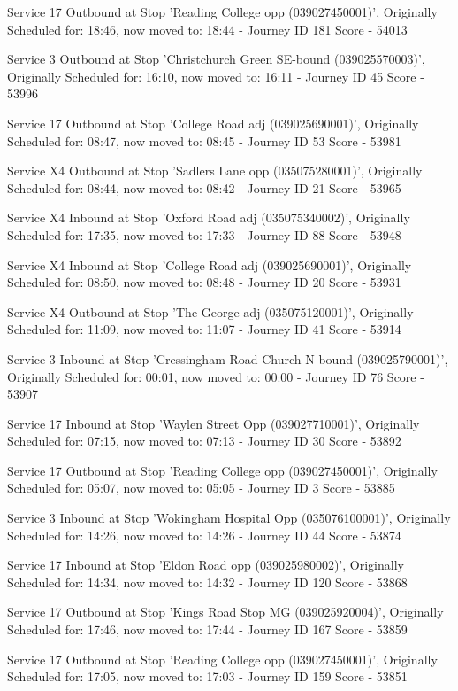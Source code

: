 \documentclass{article}
\begin{document}
Service 17 Outbound at Stop 'Reading College opp (039027450001)', Originally Scheduled for: 18:46, now moved to: 18:44 - Journey ID 181      Score - 54013

Service 3 Outbound at Stop 'Christchurch Green SE-bound (039025570003)', Originally Scheduled for: 16:10, now moved to: 16:11 - Journey ID 45      Score - 53996

Service 17 Outbound at Stop 'College Road adj (039025690001)', Originally Scheduled for: 08:47, now moved to: 08:45 - Journey ID 53      Score - 53981

Service X4 Outbound at Stop 'Sadlers Lane opp (035075280001)', Originally Scheduled for: 08:44, now moved to: 08:42 - Journey ID 21      Score - 53965

Service X4 Inbound at Stop 'Oxford Road adj (035075340002)', Originally Scheduled for: 17:35, now moved to: 17:33 - Journey ID 88      Score - 53948

Service X4 Inbound at Stop 'College Road adj (039025690001)', Originally Scheduled for: 08:50, now moved to: 08:48 - Journey ID 20      Score - 53931

Service X4 Outbound at Stop 'The George adj (035075120001)', Originally Scheduled for: 11:09, now moved to: 11:07 - Journey ID 41      Score - 53914

Service 3 Inbound at Stop 'Cressingham Road Church N-bound (039025790001)', Originally Scheduled for: 00:01, now moved to: 00:00 - Journey ID 76      Score - 53907

Service 17 Inbound at Stop 'Waylen Street Opp (039027710001)', Originally Scheduled for: 07:15, now moved to: 07:13 - Journey ID 30      Score - 53892

Service 17 Outbound at Stop 'Reading College opp (039027450001)', Originally Scheduled for: 05:07, now moved to: 05:05 - Journey ID 3      Score - 53885

Service 3 Inbound at Stop 'Wokingham Hospital Opp (035076100001)', Originally Scheduled for: 14:26, now moved to: 14:26 - Journey ID 44      Score - 53874

Service 17 Inbound at Stop 'Eldon Road opp (039025980002)', Originally Scheduled for: 14:34, now moved to: 14:32 - Journey ID 120      Score - 53868

Service 17 Outbound at Stop 'Kings Road Stop MG (039025920004)', Originally Scheduled for: 17:46, now moved to: 17:44 - Journey ID 167      Score - 53859

Service 17 Outbound at Stop 'Reading College opp (039027450001)', Originally Scheduled for: 17:05, now moved to: 17:03 - Journey ID 159      Score - 53851
\end{document}
